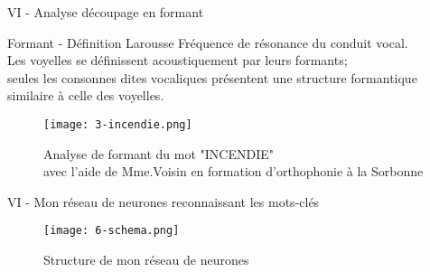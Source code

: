 \begin{frame}{VI - Analyse découpage en formant}
	\begin{block}{Formant - Définition Larousse}
		Fréquence de résonance du conduit vocal. \\
		Les voyelles se définissent acoustiquement par leurs formants; \\
		seules les consonnes dites vocaliques présentent une structure formantique similaire à celle des voyelles.
	\end{block}
	\begin{figure}
		\begin{center}
			\centering
			\texttt{[image: 3-incendie.png]}
			\caption{Analyse de formant du mot "INCENDIE" \\avec l'aide de Mme.Voisin en formation d'orthophonie à la Sorbonne}
		\end{center}
	\end{figure}
\end{frame}


\begin{frame}{VI - Mon réseau de neurones reconnaissant les mots-clés}
	\begin{figure}
		\centering
		\texttt{[image: 6-schema.png]}
		\caption{Structure de mon réseau de neurones}
	\end{figure}
	

\end{frame}